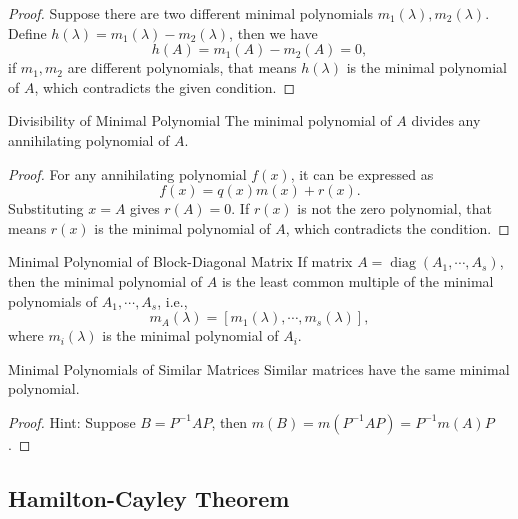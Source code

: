 \begin{proof}
  Suppose there are two different minimal polynomials $m_1(\lambda),
  m_2(\lambda)$.
  Define $h(\lambda) = m_1(\lambda) - m_2(\lambda)$,
  then we have
  \begin{equation}
    h(A) = m_1(A) - m_2(A) = 0,
  \end{equation}
  if $m_1, m_2$ are different polynomials, that means $h(\lambda)$ is the
  minimal polynomial of $A$, which contradicts the given condition.
\end{proof}

\begin{proposition}{Divisibility of Minimal Polynomial}{}
  The minimal polynomial of $A$ divides any annihilating polynomial of $A$.
\end{proposition}

\begin{proof}
  For any annihilating polynomial $f(x)$, it can be expressed as
  \begin{equation}
    f(x) = q(x) m(x) + r(x).
  \end{equation}
  Substituting $x = A$ gives $r(A) = 0$.
  If $r(x)$ is not the zero polynomial, that means $r(x)$ is the minimal
  polynomial of $A$, which contradicts the condition.
\end{proof}

\begin{proposition}{Minimal Polynomial of Block-Diagonal Matrix}{}
  If matrix $A = \operatorname{diag}(A_1,\cdots,A_s)$,
  then the minimal polynomial of $A$ is the least common multiple
  of the minimal polynomials of $A_1,\cdots,A_s$, i.e.,
  \begin{equation}
    m_A(\lambda) = [m_1(\lambda),\cdots,m_s(\lambda)],
  \end{equation}
  where $m_i(\lambda)$ is the minimal polynomial of $A_i$.
\end{proposition}

\begin{proposition}{Minimal Polynomials of Similar Matrices}{}
  Similar matrices have the same minimal polynomial.
\end{proposition}

\begin{proof}
  Hint: Suppose $B = P^{-1}AP$,
  then $m(B) = m(P^{-1}AP) = P^{-1}m(A)P$.
\end{proof}

\subsection{Hamilton-Cayley Theorem}


